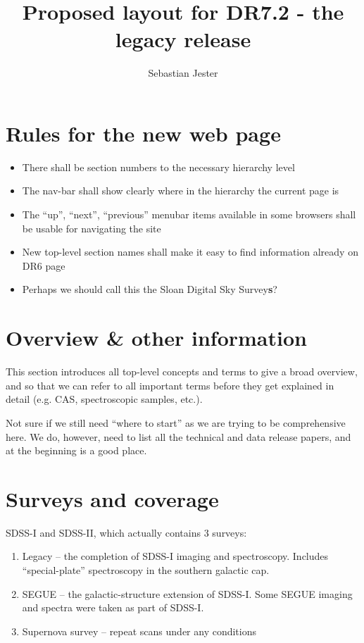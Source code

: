 \documentclass{article}
\title{Proposed layout for DR7.2 - the legacy release}
\author{Sebastian Jester}
\begin{document}
\maketitle
\setcounter{section}{-1}

\section{Rules for the new web page}
\begin{itemize}
\item There shall be section numbers to the necessary hierarchy level
\item The nav-bar shall show clearly where in the hierarchy the
  current page is
\item The ``up'', ``next'', ``previous'' menubar items available in
  some browsers shall be usable for navigating the site
\item New top-level section names shall make it easy to find
  information already on DR6 page
\item Perhaps we should call this the Sloan Digital Sky Survey\textbf{s}?
\end{itemize}

\section{Overview \& other information}
This section introduces all top-level concepts and terms to give a
broad overview, and so that we can refer to all important terms
before they get explained in detail (e.g. CAS, spectroscopic samples,
etc.).

Not sure if we still need ``where to start'' as we are trying to be
comprehensive here. We do, however, need to list all the technical and
data release papers, and at the beginning is a good place.

\section{Surveys and coverage}

SDSS-I and SDSS-II, which actually contains 3 surveys:
\begin{enumerate}
\item Legacy -- the completion of SDSS-I imaging and
  spectroscopy. Includes ``special-plate'' spectroscopy in the
  southern galactic cap.
\item SEGUE -- the galactic-structure extension of SDSS-I. Some SEGUE
  imaging and spectra were taken as part of SDSS-I.
\item Supernova survey -- repeat scans under any conditions
\end{enumerate}
\end{document}
